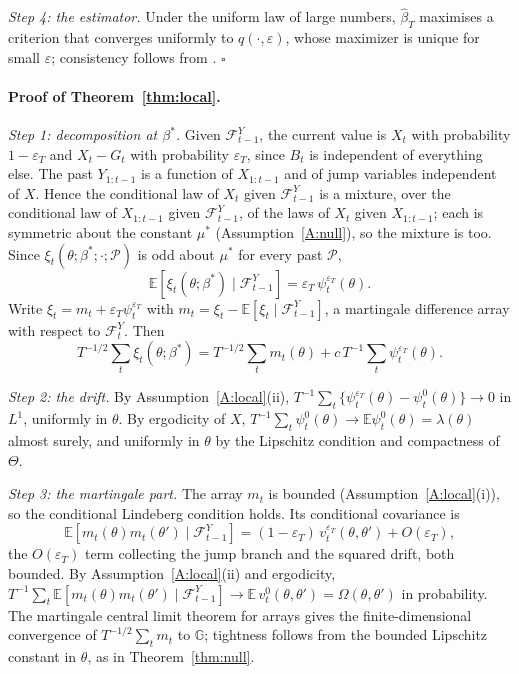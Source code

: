 \documentclass[11pt,a4paper]{article}
\theoremstyle{definition}
\theoremstyle{remark}
\newcommand{\E}{\mathbb{E}}
\newcommand{\F}{\mathcal{F}}
\begin{document}
\emph{Step 4: the estimator.} Under the uniform law of large numbers, $\hat\beta_T$ maximises a criterion that converges uniformly to $q(\cdot,\varepsilon)$, whose maximizer is unique for small $\varepsilon$; consistency follows from \citet[Theorem~2.1]{newey1994}.
\hfill$\square$

\paragraph{Proof of Theorem~\ref{thm:local}.}

\emph{Step 1: decomposition at $\beta^*$.} Given $\F^Y_{t-1}$, the current value is $X_t$ with probability $1-\varepsilon_T$ and $X_t-G_t$ with probability $\varepsilon_T$, since $B_t$ is independent of everything else. The past $Y_{1:t-1}$ is a function of $X_{1:t-1}$ and of jump variables independent of $X$. Hence the conditional law of $X_t$ given $\F^Y_{t-1}$ is a mixture, over the conditional law of $X_{1:t-1}$ given $\F^Y_{t-1}$, of the laws of $X_t$ given $X_{1:t-1}$; each is symmetric about the constant $\mu^*$ (Assumption~\ref{A:null}), so the mixture is too. Since $\xi_t(\theta;\beta^*;\cdot;\mathcal P)$ is odd about $\mu^*$ for every past $\mathcal P$,
\[
\E[\xi_t(\theta;\beta^*)\mid\F^Y_{t-1}]=\varepsilon_T\,\psi^{\varepsilon_T}_t(\theta).
\]
Write $\xi_t=m_t+\varepsilon_T\psi^{\varepsilon_T}_t$ with $m_t=\xi_t-\E[\xi_t\mid\F^Y_{t-1}]$, a martingale difference array with respect to $\F^Y_t$. Then
\[
T^{-1/2}\sum_t\xi_t(\theta;\beta^*)=T^{-1/2}\sum_tm_t(\theta)+c\,T^{-1}\sum_t\psi^{\varepsilon_T}_t(\theta).
\]

\emph{Step 2: the drift.} By Assumption~\ref{A:local}(ii), $T^{-1}\sum_t\{\psi^{\varepsilon_T}_t(\theta)-\psi^0_t(\theta)\}\to0$ in $L^1$, uniformly in $\theta$. By ergodicity of $X$, $T^{-1}\sum_t\psi^0_t(\theta)\to\E\psi^0_t(\theta)=\lambda(\theta)$ almost surely, and uniformly in $\theta$ by the Lipschitz condition and compactness of $\Theta$.

\emph{Step 3: the martingale part.} The array $m_t$ is bounded (Assumption~\ref{A:local}(i)), so the conditional Lindeberg condition holds. Its conditional covariance is
\[
\E[m_t(\theta)m_t(\theta')\mid\F^Y_{t-1}]=(1-\varepsilon_T)\,v^{\varepsilon_T}_t(\theta,\theta')+O(\varepsilon_T),
\]
the $O(\varepsilon_T)$ term collecting the jump branch and the squared drift, both bounded. By Assumption~\ref{A:local}(ii) and ergodicity, $T^{-1}\sum_t\E[m_t(\theta)m_t(\theta')\mid\F^Y_{t-1}]\to\E\,v^0_t(\theta,\theta')=\Omega(\theta,\theta')$ in probability. The martingale central limit theorem for arrays \citep[Corollary~3.1]{hall1980} gives the finite-dimensional convergence of $T^{-1/2}\sum_tm_t$ to $\mathbb G$; tightness follows from the bounded Lipschitz constant in $\theta$, as in Theorem~\ref{thm:null}.
\end{document}
